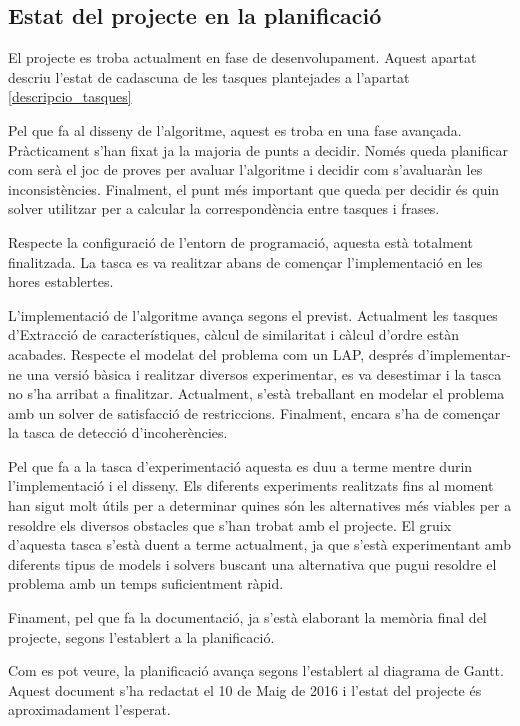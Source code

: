 \documentclass[10pt,a4paper]{article}
\begin{document}
\subsection{Estat del projecte en la planificació}
\label{estat}

El projecte es troba actualment en fase de desenvolupament. Aquest apartat descriu l'estat de cadascuna de les tasques plantejades a l'apartat \ref{descripcio_tasques}

Pel que fa al disseny de l'algoritme, aquest es troba en una fase avançada. Pràcticament s'han fixat ja la majoria de punts a decidir. Només queda planificar com serà el joc de proves per avaluar l'algoritme i decidir com s'avaluaràn les inconsistències. Finalment, el punt més important que queda per decidir és quin solver utilitzar per a calcular la correspondència entre tasques i frases.

Respecte la configuració de l'entorn de programació, aquesta està totalment finalitzada. La tasca es va realitzar abans de començar l'implementació en les hores establertes.

L'implementació de l'algoritme avança segons el previst. Actualment les tasques d'Extracció de característiques, càlcul de similaritat i càlcul d'ordre estàn acabades. Respecte el modelat del problema com un LAP, després d'implementar-ne una versió bàsica i realitzar diversos experimentar, es va desestimar i la tasca no s'ha arribat a finalitzar. Actualment, s'està treballant en modelar el problema amb un solver de satisfacció de restriccions. Finalment, encara s'ha de començar la tasca de detecció d'incoherències. 

Pel que fa a la tasca d'experimentació aquesta es duu a terme mentre durin l'implementació i el disseny. Els diferents experiments realitzats fins al moment han sigut molt útils per a determinar quines són les alternatives més viables per a resoldre els diversos obstacles que s'han trobat amb el projecte. El gruix d'aquesta tasca s'està duent a terme actualment, ja que s'està experimentant amb diferents tipus de models i solvers buscant una alternativa que pugui resoldre el problema amb un temps suficientment ràpid.

Finament, pel que fa la documentació, ja s'està elaborant la memòria final del projecte, segons l'establert a la planificació.

Com es pot veure, la planificació avança segons l'establert al diagrama de Gantt. Aquest document s'ha redactat el 10 de Maig de 2016 i l'estat del projecte és aproximadament l'esperat.
\end{document}
